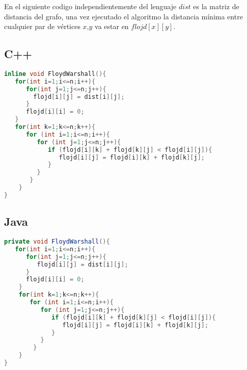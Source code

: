 En el siguiente codigo independientemente del lenguaje $dist$ es la matriz de distancia del grafo, una vez ejecutado el algoritmo la distancia mínima entre cualquier par de vértices $x$,$y$ va estar en $flojd[x][y]$.

\subsection{C++}

\begin{lstlisting}[language=C++]
inline void FloydWarshall(){
   for(int i=1;i<=n;i++){
      for(int j=1;j<=n;j++){
      	flojd[i][j] = dist[i][j];
      }
      flojd[i][i] = 0;
   }
   for(int k=1;k<=n;k++){
      for (int i=1;i<=n;i++){
      	 for (int j=1;j<=n;j++){
            if (flojd[i][k] + flojd[k][j] < flojd[i][j]){
               flojd[i][j] = flojd[i][k] + flojd[k][j];
            }
         }
       }
    }
}
\end{lstlisting} 

\subsection{Java}

\begin{lstlisting}[language=Java]
private void FloydWarshall(){
   for(int i=1;i<=n;i++){
      for(int j=1;j<=n;j++){
         flojd[i][j] = dist[i][j];
      }
      flojd[i][i] = 0;
    }
    for(int k=1;k<=n;k++){
       for (int i=1;i<=n;i++){
          for (int j=1;j<=n;j++){
             if (flojd[i][k] + flojd[k][j] < flojd[i][j]){
                flojd[i][j] = flojd[i][k] + flojd[k][j];
             }
          }
        }
    }
}
\end{lstlisting}